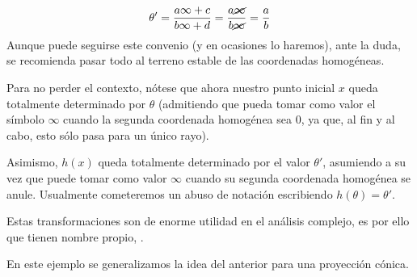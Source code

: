 \begin{exa}
	\[\theta'=\frac{a\infty+c}{b\infty+d}=\frac{a\cancel{\infty}}{b\cancel{\infty}}=\frac{a}{b}\]
	Aunque puede seguirse este convenio (y en ocasiones lo haremos), ante la duda, se recomienda pasar todo al terreno estable de las coordenadas homogéneas.
	
	Para no perder el contexto, nótese que ahora nuestro punto inicial $x$ queda totalmente determinado por $\theta$ (admitiendo que pueda tomar como valor el símbolo $\infty$ cuando la segunda coordenada homogénea sea $0$, ya que, al fin y al cabo, esto sólo pasa para un único rayo).
	
	Asimismo, $h(x)$ queda totalmente determinado por el valor $\theta'$, asumiendo a su vez que puede tomar como valor $\infty$ cuando su segunda coordenada homogénea se anule. Usualmente cometeremos un abuso de notación escribiendo $h(\theta)=\theta'$.
	
	Estas transformaciones son de enorme utilidad en el análisis complejo, es por ello que tienen nombre propio, .
\end{exa}
En este ejemplo se generalizamos la idea del anterior para una proyección cónica.
